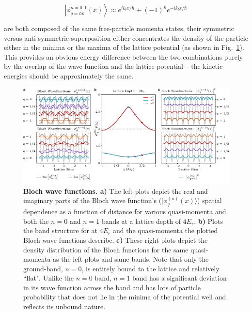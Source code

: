 \[
 \left | \phi_{q=\hbar k}^{n=0,1} (x) \right \rangle \approx e^{i k_l x/\hbar} + (-1)^n e^{-i k_l x/\hbar}
 \]
 
 are both composed of the same free-particle momenta states, their symmetric versus anti-symmetric superposition either concentrates the density of the particle either in the minima or the maxima of the lattice potential (as shown in Fig.~\ref{fig:blochFX}). This provides an obvious energy difference between the two combinations purely by the overlap of the wave function and the lattice potential -- the kinetic energies should be approximately the same.

\begin{figure}[t!]
		\includegraphics[width=\columnwidth]{figures/ch1/blochFx/BlochFunctionsBS2_v2edit.pdf} 
		\caption{\textbf{Bloch wave functions. a)} The left plots depict the real and imaginary parts of the Bloch wave function's ($ | \phi_q^{(n)} (x) \rangle$) spatial dependence as a function of distance for various quasi-momenta and both the $n=0$ and $n=1$ bands at a lattice depth of $4E_r$. \textbf{b)} Plots the band structure for at $4E_r$ and the quasi-momenta the plotted Bloch wave functions describe. \textbf{c)} These right plots depict the density distribution of the Bloch functions for the same quasi-momenta as the left plots and same bands. Note that only the ground-band, $n=0$, is entirely bound to the lattice and relatively ``flat". Unlike the $n=0$ band, $n=1$ band has a significant deviation in its wave function across the band and has lots of particle probability that does not lie in the minima of the potential well and reflects its unbound nature.}
		\label{fig:blochFX}	
\end{figure}

